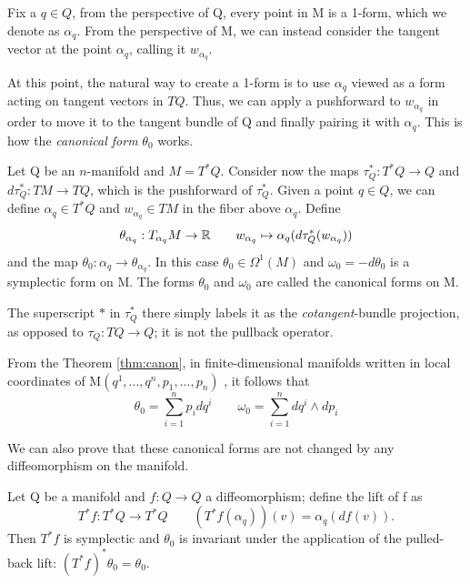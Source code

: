 Fix a $q \in Q$, from the perspective of Q, every point in M is a 1-form, which we denote as $\alpha_q$. From the perspective of M, we can instead consider the tangent vector at the point $\alpha_q$, calling it $w_{\alpha_q}$. 

At this point, the natural way to create a 1-form is to use $\alpha_q$ viewed as a form acting on tangent vectors in $TQ$. Thus, we can apply a pushforward to $w_{\alpha_q}$ in order to move it to the tangent bundle of Q and finally pairing it with $\alpha_q$. This is how the \textit{canonical form} $\theta_0$ works.

\begin{theorem}\label{thm:canon}
	Let Q be an $n$-manifold and $M = T^*Q$. Consider now the maps $\tau^*_Q: T^*Q \to Q$ and $d\tau^*_Q: TM \to TQ$, which is the pushforward of $\tau^*_Q$. Given a point $q \in Q$, we can define $\alpha_q \in T^*Q$ and $w_{\alpha_q} \in TM$ in the fiber above $\alpha_q$. Define
	\[
		\theta_{\alpha_q} : T_{\alpha_q}M \to \mathbb{R} \qquad w_{\alpha_q} \mapsto \alpha_q(d \tau^*_Q(w_{\alpha_q}))
	\] 
	and the map $\theta_0: \alpha_q \to \theta_{\alpha_q}$. In this case $\theta_0 \in \Omega^1(M)$ and $\omega_0=-d\theta_0$ is a symplectic form on M. The forms $\theta_0$ and $\omega_0$ are called the canonical forms on M.
\end{theorem}

\begin{remark}
	The superscript $*$ in $\tau^*_Q$ there simply labels it as the \emph{cotangent}-bundle projection, as opposed to $\tau_Q: TQ \to Q$; it is not the pullback operator. 
\end{remark}

\begin{corollary}\label{crl:canon-coord}
	From the Theorem \ref{thm:canon}, in finite-dimensional manifolds written in local coordinates of M$(q^1,...,q^n,p_1,...,p_n)$ , it follows that
	\[
		\theta_0 = \sum_{i=1}^n p_i dq^i \qquad \omega_0 = \sum_{i=1}^n dq^i \wedge dp_i
	\]
\end{corollary}

We can also prove that these canonical forms are not changed by any diffeomorphism on the manifold.
\begin{theorem}\label{thm:inv-canon}
	Let Q be a manifold and $f: Q \to Q$ a diffeomorphism; define the lift of f as
	\[
		T^*f : T^*Q \to T^*Q \qquad (T^*f(\alpha_q))(v) = \alpha_q(df(v)).
	\]
	Then $T^*f$ is symplectic and $\theta_0$ is invariant under the application of the pulled-back lift:  $(T^*f)^*\theta_0 = \theta_0$.
\end{theorem}

